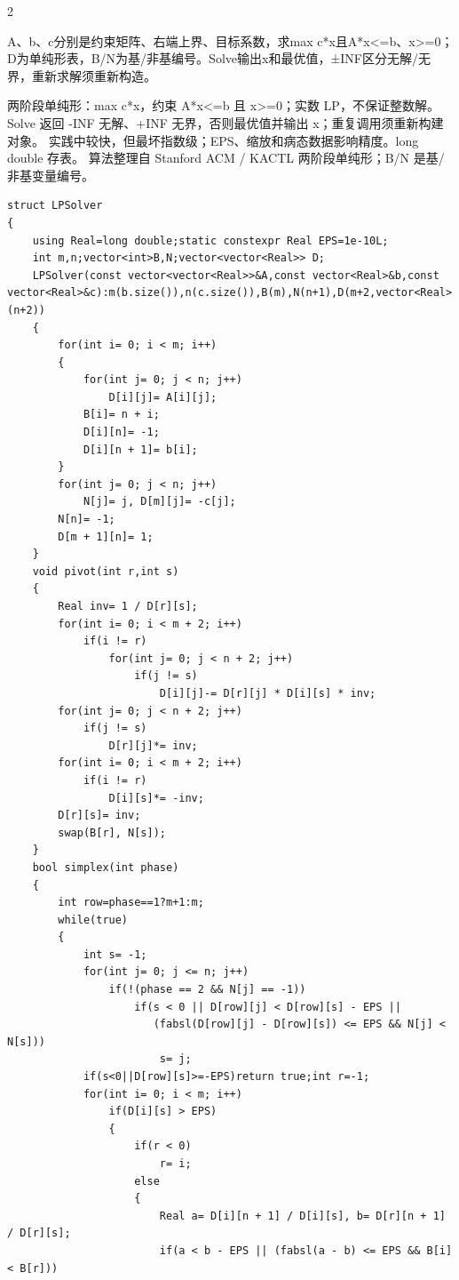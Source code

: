 \documentclass[UTF8,fontset=fandol,a4paper,twoside]{ctexart}
\newcommand{\note}[1]{{\fontsize{10}{12}\selectfont #1\par}}
\begin{document}
\begin{multicols}{2}
\note{A、b、c分别是约束矩阵、右端上界、目标系数，求max c*x且A*x<\allowbreak{}=\allowbreak{}b、x>\allowbreak{}=\allowbreak{}0；D为单纯形表，B/\allowbreak{}N为基/\allowbreak{}非基编号。Solve输出x和最优值，±INF区分无解/\allowbreak{}无界，重新求解须重新构造。}
\note{两阶段单纯形：max c*x，约束 A*x<\allowbreak{}=\allowbreak{}b 且 x>\allowbreak{}=\allowbreak{}0；实数 LP，不保证整数解。 Solve 返回 -\allowbreak{}INF 无解、+\allowbreak{}INF 无界，否则最优值并输出 x；重复调用须重新构建对象。 实践中较快，但最坏指数级；EPS、缩放和病态数据影响精度。long double 存表。 算法整理自 Stanford ACM /\allowbreak{} KACTL 两阶段单纯形；B/\allowbreak{}N 是基/\allowbreak{}非基变量编号。}
\begin{lstlisting}
struct LPSolver
{
    using Real=long double;static constexpr Real EPS=1e-10L;
    int m,n;vector<int>B,N;vector<vector<Real>> D;
    LPSolver(const vector<vector<Real>>&A,const vector<Real>&b,const vector<Real>&c):m(b.size()),n(c.size()),B(m),N(n+1),D(m+2,vector<Real>(n+2))
    {
        for(int i= 0; i < m; i++)
        {
            for(int j= 0; j < n; j++)
                D[i][j]= A[i][j];
            B[i]= n + i;
            D[i][n]= -1;
            D[i][n + 1]= b[i];
        }
        for(int j= 0; j < n; j++)
            N[j]= j, D[m][j]= -c[j];
        N[n]= -1;
        D[m + 1][n]= 1;
    }
    void pivot(int r,int s)
    {
        Real inv= 1 / D[r][s];
        for(int i= 0; i < m + 2; i++)
            if(i != r)
                for(int j= 0; j < n + 2; j++)
                    if(j != s)
                        D[i][j]-= D[r][j] * D[i][s] * inv;
        for(int j= 0; j < n + 2; j++)
            if(j != s)
                D[r][j]*= inv;
        for(int i= 0; i < m + 2; i++)
            if(i != r)
                D[i][s]*= -inv;
        D[r][s]= inv;
        swap(B[r], N[s]);
    }
    bool simplex(int phase)
    {
        int row=phase==1?m+1:m;
        while(true)
        {
            int s= -1;
            for(int j= 0; j <= n; j++)
                if(!(phase == 2 && N[j] == -1))
                    if(s < 0 || D[row][j] < D[row][s] - EPS ||
                       (fabsl(D[row][j] - D[row][s]) <= EPS && N[j] < N[s]))
                        s= j;
            if(s<0||D[row][s]>=-EPS)return true;int r=-1;
            for(int i= 0; i < m; i++)
                if(D[i][s] > EPS)
                {
                    if(r < 0)
                        r= i;
                    else
                    {
                        Real a= D[i][n + 1] / D[i][s], b= D[r][n + 1] / D[r][s];
                        if(a < b - EPS || (fabsl(a - b) <= EPS && B[i] < B[r]))

\end{lstlisting}
\end{multicols}
\end{document}
